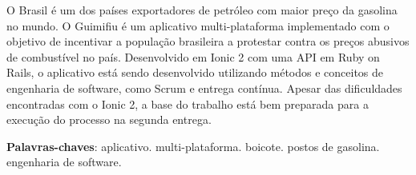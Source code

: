 \begin{resumo}

O Brasil é um dos países exportadores de petróleo com maior preço da gasolina no mundo. O Guimifiu é um aplicativo multi-plataforma implementado com o objetivo de incentivar a população brasileira a protestar contra os preços abusivos de combustível no país. Desenvolvido em Ionic 2 com uma API em Ruby on Rails, o aplicativo está sendo desenvolvido utilizando métodos e conceitos de engenharia de software, como Scrum e entrega contínua. Apesar das dificuldades encontradas com o Ionic 2, a base do trabalho está bem preparada para a execução do processo na segunda entrega.

 \vspace{\onelineskip}
    
 \noindent
 \textbf{Palavras-chaves}: aplicativo. multi-plataforma. boicote. postos de gasolina. engenharia de software. 
\end{resumo}
